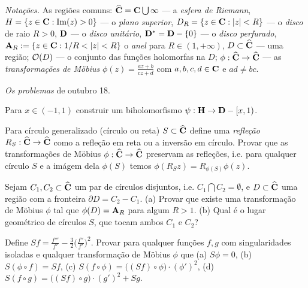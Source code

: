 \emph{Notações.}
As regiões comuns:
$\widehat{\mathbf{C}} = \mathbf{C} \bigcup \infty$ --- a \emph{esfera de Riemann},
$H = \{z\in\mathbf{C}: \operatorname{Im}(z)>0\}$ --- o \emph{plano superior},
$D_R = \{z\in\mathbf{C}: |z|<R\}$ --- o \emph{disco} de raio $R>0$,
$\mathbf{D}$ --- o \emph{disco unitário},
$\mathbf{D}^* = \mathbf{D} - \{0\}$ --- o \emph{disco perfurado},
$\mathbf{A}_R := \{z\in\mathbf{C}: 1/R < |z| < R \}$ o \emph{anel} para $R\in(1,+\infty)$,
$D\subset \widehat{\mathbf{C}}$ --- uma região;
$\mathcal{O}(D)$ --- o conjunto das funções holomorfas na $D$;
$\phi : \widehat{\mathbf{C}}\to\widehat{\mathbf{C}}$ --- as \emph{transformações de Möbius} 
$\phi(z) = \frac{az+b}{cz+d}$
com $a,b,c,d\in\mathbf{C}$ e $ad\neq bc$.

\bigskip
\emph{Os problemas} de outubro 18.

\begin{prob}\label{p1} %
Para $x\in(-1,1)$
construir um biholomorfismo %
$\psi: \mathbf{H} \to \mathbf{D} - [x,1)$.
\end{prob}

\begin{prob}\label{p2} %
Para círculo generalizado (círculo ou reta) $S \subset \widehat{\mathbf{C}}$ define
uma \emph{refleção}
$R_S : \widehat{\mathbf{C}} \to \widehat{\mathbf{C}}$ como a refleção em reta ou a inversão em círculo.
Provar que as transformações de Möbius $\phi : \widehat{\mathbf{C}}\to\widehat{\mathbf{C}}$
preservam as refleções, i.e. para qualquer
círculo $S$ e a imágem dela $\phi(S)$ temos $\phi(R_S z) = R_{\phi(S)} \phi(z)$.
\end{prob}

\begin{prob}\label{p3} %
Sejam $C_1,C_2 \subset \widehat{\mathbf{C}}$ um par de círculos disjuntos, i.e. $C_1 \bigcap C_2 = \emptyset$,
e $D \subset \widehat{\mathbf{C}}$ uma região com a fronteira $\partial D = C_2 - C_1$.
(a) Provar que existe uma transformação de Möbius $\phi$ tal que
$\phi(D) = \mathbf{A}_R$ para algum $R>1$. %
(b) Qual é o lugar geométrico de círculos $S$, que tocam ambos $C_1$ e $C_2$?
\end{prob}

\begin{prob}\label{p4} %
Define $Sf = \frac{f'''}{f'} - \frac{3}{2} \big(\frac{f''}{f'}\big)^2$.
Provar para qualquer funções $f,g$ com singularidades isoladas e qualquer
transformação de Möbius $\phi$ que
(a) $S \phi = 0$,
(b) $S (\phi \circ f) = S f$,
(c) $S(f \circ \phi) = \big((Sf)\circ\phi\big) \cdot (\phi')^2$,
(d) $S(f\circ g) = \big((Sf)\circ g\big) \cdot (g')^2 + Sg$.
\end{prob}

